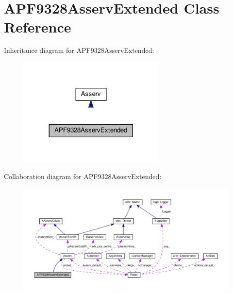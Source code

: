 \hypertarget{classAPF9328AsservExtended}{}\section{A\+P\+F9328\+Asserv\+Extended Class Reference}
\label{classAPF9328AsservExtended}


Inheritance diagram for A\+P\+F9328\+Asserv\+Extended\+:
\nopagebreak
\begin{figure}[H]
\begin{center}
\leavevmode
\includegraphics[width=209pt]{classAPF9328AsservExtended__inherit__graph}
\end{center}
\end{figure}


Collaboration diagram for A\+P\+F9328\+Asserv\+Extended\+:
\nopagebreak
\begin{figure}[H]
\begin{center}
\leavevmode
\includegraphics[width=350pt]{classAPF9328AsservExtended__coll__graph}
\end{center}
\end{figure}
